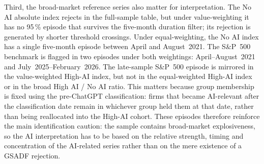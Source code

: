 Third, the broad-market reference series also matter for interpretation. The No AI absolute index rejects in the full-sample table, but under value-weighting it has no 95\,\% episode that survives the five-month duration filter; its rejection is generated by shorter threshold crossings. Under equal-weighting, the No AI index has a single five-month episode between April and August~2021. The S\&P~500 benchmark is flagged in two episodes under both weightings: April--August~2021 and July~2025--February~2026. The late-sample S\&P~500 episode is mirrored in the value-weighted High-AI index, but not in the equal-weighted High-AI index or in the broad High AI / No AI ratio. This matters because group membership is fixed using the pre-ChatGPT classification: firms that became AI-relevant after the classification date remain in whichever group held them at that date, rather than being reallocated into the High-AI cohort. These episodes therefore reinforce the main identification caution: the sample contains broad-market explosiveness, so the AI interpretation has to be based on the relative strength, timing and concentration of the AI-related series rather than on the mere existence of a GSADF rejection.
 
